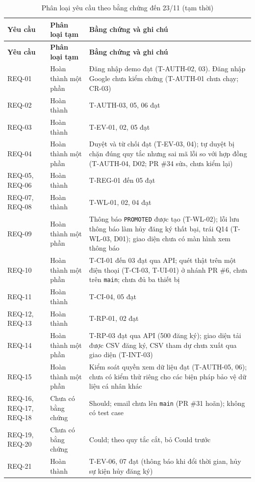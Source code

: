 \begingroup\tblsetup\tblzebra
\begin{longtable}{L{1.6cm}L{2.4cm}L{9.0cm}}
\caption{Phân loại yêu cầu theo bằng chứng đến 23/11 (tạm thời)}\label{tab:scope-status}\\
\toprule
{}\textbf{Yêu cầu} & \textbf{Phân loại tạm} & \textbf{Bằng chứng và ghi chú} \\
\midrule
\endfirsthead
\toprule
{}\textbf{Yêu cầu} & \textbf{Phân loại tạm} & \textbf{Bằng chứng và ghi chú} \\
\midrule
\endhead
\bottomrule
\endlastfoot
REQ-01 & Hoàn thành một phần & Đăng nhập demo đạt (T-AUTH-02, 03). Đăng nhập Google chưa kiểm chứng (T-AUTH-01 chưa chạy; CR-03) \\
REQ-02 & Hoàn thành & T-AUTH-03, 05, 06 đạt \\
REQ-03 & Hoàn thành & T-EV-01, 02, 05 đạt \\
REQ-04 & Hoàn thành một phần & Duyệt và từ chối đạt (T-EV-03, 04); tự duyệt bị chặn đúng quy tắc nhưng sai mã lỗi so với hợp đồng (T-AUTH-04, D02; PR \#34 sửa, chưa kiểm lại) \\
REQ-05, REQ-06 & Hoàn thành & T-REG-01 đến 05 đạt \\
REQ-07, REQ-08 & Hoàn thành & T-WL-01, 02, 04 đạt \\
REQ-09 & Hoàn thành một phần & Thông báo \texttt{PROMOTED} được tạo (T-WL-02); lỗi lưu thông báo làm hủy đăng ký thất bại, trái Q14 (T-WL-03, D01); giao diện chưa có màn hình xem thông báo \\
REQ-10 & Hoàn thành một phần & T-CI-01 đến 03 đạt qua API; quét thật trên một điện thoại (T-CI-03, T-UI-01) ở nhánh PR \#6, chưa trên \texttt{main}; chưa đủ ba thiết bị \\
REQ-11 & Hoàn thành & T-CI-04, 05 đạt \\
REQ-12, REQ-13 & Hoàn thành & T-RP-01, 02 đạt \\
REQ-14 & Hoàn thành một phần & T-RP-03 đạt qua API (500 đăng ký); giao diện tải được CSV đăng ký, CSV tham dự chưa xuất qua giao diện (T-INT-03) \\
REQ-15 & Hoàn thành một phần & Kiểm soát quyền xem dữ liệu đạt (T-AUTH-05, 06); chưa có kiểm thử riêng cho các biện pháp bảo vệ dữ liệu cá nhân khác \\
REQ-16, REQ-17, REQ-18 & Chưa có bằng chứng & Should; email chưa lên \texttt{main} (PR \#31 hoãn); không có test case \\
REQ-19, REQ-20 & Chưa có bằng chứng & Could; theo quy tắc cắt, bỏ Could trước \\
REQ-21 & Hoàn thành & T-EV-06, 07 đạt (thông báo khi đổi thời gian, hủy sự kiện hủy đăng ký) \\
\end{longtable}
\endgroup

